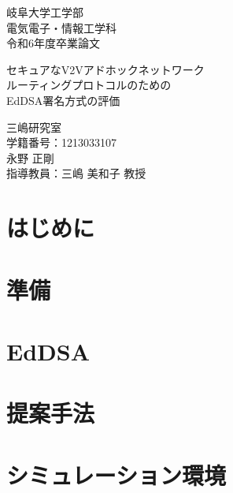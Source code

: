 \documentclass[
  luatex,
  paper=a4paper,
  fontsize=11pt,
  report,
  jlreq_notes,
]{jlreq}
\begin{document}
\begin{titlepage}
  \centering

  {\Large
    岐阜大学工学部 \\ [0.5em]
    電気電子・情報工学科 \\ [0.5em]
    令和6年度卒業論文 \\
  } 
  \vspace{8em} 

  {\huge
    セキュアなV2Vアドホックネットワーク \\
    ルーティングプロトコルのための \\
    EdDSA署名方式の評価 \\
  }
  \vspace{12em}

  \LARGE 三嶋研究室 \\ [1em]
  \Large 学籍番号：1213033107 \\ 
  \huge 永野 正剛 \\ [1em]
  \LARGE 指導教員：三嶋 美和子 教授 \\

  \vfill 
\end{titlepage}

\tableofcontents

\clearpage

\chapter*{はじめに}
\chapter[　　 準備]{準備}

\chapter[　　 EdDSA]{EdDSA}

\chapter[　　 提案手法]{提案手法}

\chapter[　　 シミュレーション環境]{シミュレーション環境}

\end{document}
